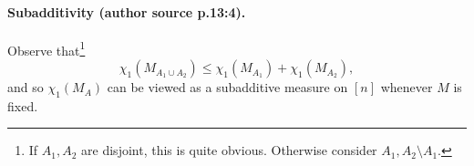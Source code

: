 \paragraph{Subadditivity (author source p.13:4).}
Observe that\footnote{If $A_1,A_2$ are disjoint, this is quite obvious. Otherwise consider $A_1,A_2\setminus A_1$.}
\[\chi_1(M_{A_1\cup A_2})\le\chi_1(M_{A_1})+\chi_1(M_{A_2}),\tag{1}\]
and so $\chi_1(M_A)$ can be viewed as a subadditive measure on $[n]$ whenever $M$ is fixed.
